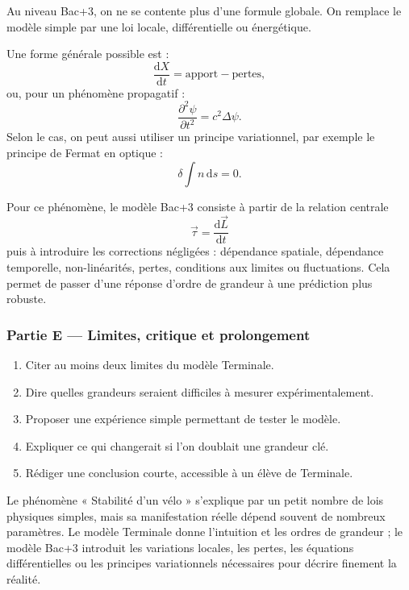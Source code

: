 \documentclass[11pt,a4paper]{article}
\begin{document}
\begin{approfondissementbox}
Au niveau Bac+3, on ne se contente plus d'une formule globale. On remplace le modèle simple par une loi locale, différentielle ou énergétique.

Une forme générale possible est :
\[
\frac{\mathrm d X}{\mathrm dt}=\text{apport}-\text{pertes},
\]
ou, pour un phénomène propagatif :
\[
\frac{\partial^2 \psi}{\partial t^2}=c^2\Delta\psi.
\]
Selon le cas, on peut aussi utiliser un principe variationnel, par exemple le principe de Fermat en optique :
\[
\delta \int n\,\mathrm ds=0.
\]

Pour ce phénomène, le modèle Bac+3 consiste à partir de la relation centrale
\[
\vec\tau=\frac{\mathrm d\vec L}{\mathrm dt}
\]
puis à introduire les corrections négligées : dépendance spatiale, dépendance temporelle, non-linéarités, pertes, conditions aux limites ou fluctuations. Cela permet de passer d'une réponse d'ordre de grandeur à une prédiction plus robuste.
\end{approfondissementbox}

\subsubsection*{Partie E — Limites, critique et prolongement}

\begin{enumerate}
  \item Citer au moins deux limites du modèle Terminale.
  \item Dire quelles grandeurs seraient difficiles à mesurer expérimentalement.
  \item Proposer une expérience simple permettant de tester le modèle.
  \item Expliquer ce qui changerait si l'on doublait une grandeur clé.
  \item Rédiger une conclusion courte, accessible à un élève de Terminale.
\end{enumerate}

\begin{corrigebox}
Le phénomène « Stabilité d'un vélo » s'explique par un petit nombre de lois physiques simples, mais sa manifestation réelle dépend souvent de nombreux paramètres. Le modèle Terminale donne l'intuition et les ordres de grandeur ; le modèle Bac+3 introduit les variations locales, les pertes, les équations différentielles ou les principes variationnels nécessaires pour décrire finement la réalité.
\end{corrigebox}
\end{document}
